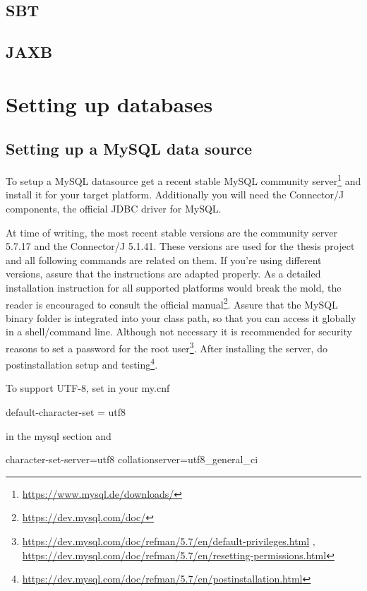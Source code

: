 \subsection{SBT}

\subsection{JAXB}


\section{Setting up databases}


\subsection{Setting up a MySQL data source}

To setup a MySQL datasource get a recent stable MySQL community server\footnote{\url{https://www.mysql.de/downloads/}} 
and install it for your target platform. Additionally you will need the Connector/J components, the official JDBC driver for MySQL. 

At time of writing, the most recent stable versions are the community server 5.7.17 and the Connector/J 5.1.41. These versions are used for the thesis project and all following commands are related on them. If you're using 
different versions, assure that the instructions are adapted properly. As a detailed installation instruction for all supported platforms would break the mold, the reader is encouraged to consult the official 
manual\footnote{\url{https://dev.mysql.com/doc/}}. 
Assure that the MySQL binary folder is integrated into your class path, so that you can access it globally in a shell/command line. Although not necessary it is recommended for security reasons 
to set a password for the root user\footnote{\url{https://dev.mysql.com/doc/refman/5.7/en/default-privileges.html} , \url{https://dev.mysql.com/doc/refman/5.7/en/resetting-permissions.html}}. 
After installing the server, do postinstallation setup and testing\footnote{\url{https://dev.mysql.com/doc/refman/5.7/en/postinstallation.html}}. 

To support UTF-8, set in your my.cnf 

\begin{codebox}
	default-character-set = utf8
\end{codebox}

in the mysql section and

\begin{codebox}
	character-set-server=utf8\newline
	collation\-server=utf8\_general\_ci
\end{codebox}

